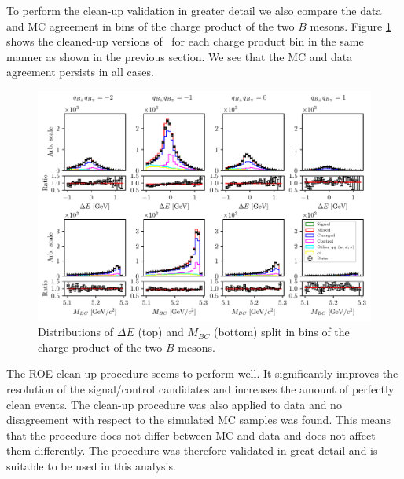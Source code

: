 To perform the clean-up validation in greater detail we also compare the data and MC agreement in bins of the charge product of the two $B$ mesons. Figure \ref{fig:roe_val_split} shows the cleaned-up versions of \vars~for each charge product bin in the same manner as shown in the previous section. We see that the MC and data agreement persists in all cases. 
\begin{figure}[H]
	\centering
	\captionsetup{width=0.8\linewidth}
	\includegraphics[width=\linewidth]{fig/roe_val_split}
	\caption{Distributions of $\Delta E$ (top) and $M_{BC}$ (bottom) split in bins of the charge product of the two $B$ mesons.}
	\label{fig:roe_val_split}
\end{figure}

The ROE clean-up procedure seems to perform well. It significantly improves the resolution of the signal/control candidates and increases the amount of perfectly clean events. The clean-up procedure was also applied to data and no disagreement with respect to the simulated MC samples was found. This means that the procedure does not differ between MC and data and does not affect them differently. The procedure was therefore validated in great detail and is suitable to be used in this analysis.